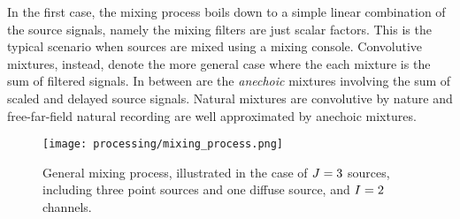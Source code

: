 In the first case, the mixing process boils down to a simple linear combination of the source signals, namely
the mixing filters are just scalar factors.
This is the typical scenario when sources are mixed using a mixing console.
Convolutive mixtures, instead, denote the more general case where the each mixture is the sum of filtered signals.
In between are the \textit{anechoic} mixtures involving the sum of scaled and delayed source signals.
Natural mixtures are convolutive by nature and free-far-field natural recording are well approximated by anechoic mixtures.

\begin{figure}[t]
    \begin{fullwidth}
        \texttt{[image: processing/mixing\_process.png]}

        \caption{General mixing process, illustrated in the case of $J = 3$ sources,
        including three point sources and one diffuse source, and $I = 2$ channels.}

        \label{fig:processing:mixing}
    \end{fullwidth}
\end{figure}

